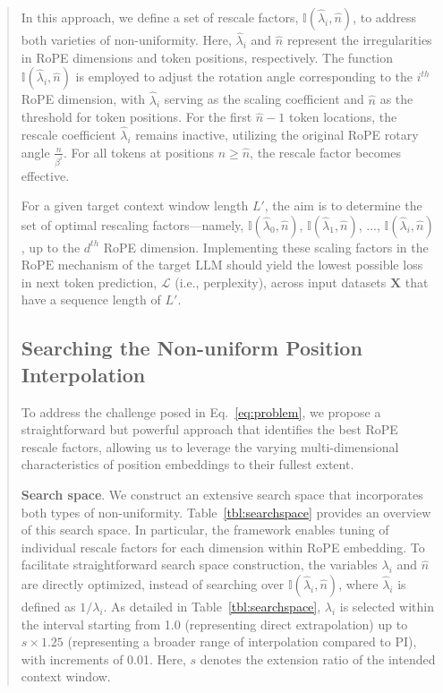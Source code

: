 \begin{abstract}
In this approach, we define a set of rescale factors, $\mathbb{I}(\hat{\lambda}_{i},\hat{n})$, to address both varieties of non-uniformity. Here, $\hat{\lambda}_{i}$ and $\hat{n}$ represent the irregularities in RoPE dimensions and token positions, respectively. The function $\mathbb{I}(\hat{\lambda}_{i},\hat{n})$ is employed to adjust the rotation angle corresponding to the $i^{th}$ RoPE dimension, with $\hat{\lambda}_{i}$ serving as the scaling coefficient and $\hat{n}$ as the threshold for token positions. For the first $\hat{n}-1$ token locations, the rescale coefficient $\hat{\lambda}_{i}$ remains inactive, utilizing the original RoPE rotary angle $\frac{n}{\beta^i}$. For all tokens at positions $n \geq \hat{n}$, the rescale factor becomes effective.

For a given target context window length $L'$, the aim is to determine the set of optimal rescaling factors—namely, $\mathbb{I}(\hat{\lambda}_{0},\hat{n})$, $\mathbb{I}(\hat{\lambda}_{1},\hat{n})$, ..., $\mathbb{I}(\hat{\lambda}_{i},\hat{n})$, up to the $d^{th}$ RoPE dimension. Implementing these scaling factors in the $\text{RoPE}$ mechanism of the target $\text{LLM}$ should yield the lowest possible loss in next token prediction, $\mathcal{L}$ (i.e., perplexity), across input datasets $\mathbf{X}$ that have a sequence length of $L'$.

\subsection{Searching the Non-uniform Position Interpolation}

To address the challenge posed in Eq.~\ref{eq:problem}, we propose a straightforward but powerful approach that identifies the best RoPE rescale factors, allowing us to leverage the varying multi-dimensional characteristics of position embeddings to their fullest extent.

\textbf{Search space}. We construct an extensive search space that incorporates both types of non-uniformity. Table~\ref{tbl:searchspace} provides an overview of this search space. In particular, the framework enables tuning of individual rescale factors for each dimension within RoPE embedding. To facilitate straightforward search space construction, the variables $\lambda_i$ and $\hat{n}$ are directly optimized, instead of searching over $\mathbb{I}(\hat{\lambda}_{i},\hat{n})$, where $\hat{\lambda}_{i}$ is defined as $1/\lambda_i$. As detailed in Table~\ref{tbl:searchspace}, $\lambda_i$ is selected within the interval starting from 1.0 (representing direct extrapolation) up to $s\times1.25$ (representing a broader range of interpolation compared to PI), with increments of 0.01. Here, $s$ denotes the extension ratio of the intended context window.


\end{abstract}

